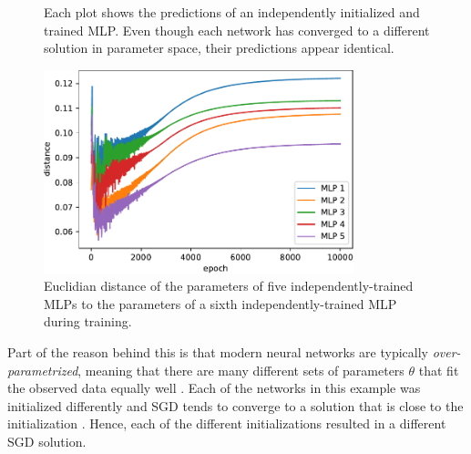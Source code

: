 \documentclass[12pt]{article}
\begin{document}
\begin{figure}[H]
\centering
{}
\caption{Each plot shows the predictions of an independently initialized and trained MLP. Even though each network has converged to a different solution in parameter space, their predictions appear identical.}
\label{fig_1d_ens_predictions}
\end{figure}

\begin{figure}[H]
\centering
\includegraphics[width=9cm]{plots/1d_ens_param_distance.pdf}
\caption{Euclidian distance of the parameters of five independently-trained MLPs to the parameters of a sixth independently-trained MLP during training.}
\label{fig_1d_ens_param_distance}
\end{figure}

Part of the reason behind this is that modern neural networks are typically \textit{over-parametrized}, meaning that there are many different sets of parameters $\theta$ that fit the observed data equally well \cite{deep_ens, underspecification, mode_connectivity}. Each of the networks in this example was initialized differently and SGD tends to converge to a solution that is close to the initialization \cite{deep_ens, knowledge_distillation}. Hence, each of the different initializations resulted in a different SGD solution.
\end{document}
